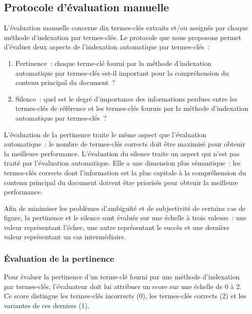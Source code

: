     \subsection{Protocole d'évaluation manuelle}
    \label{subsec:main-automatic_evaluation_of_keyphrase_annotation-methodology-evaluation_protocol}
      L'évaluation manuelle concerne dix termes-clés extraits et/ou assignés par
      chaque méthode d'indexation par termes-clés. Le protocole que nous
      proposons permet d'évaluer deux aspects de l'indexation automatique par
      termes-clés~:
      \begin{enumerate}
        \item{Pertinence~: chaque terme-clé fourni par la méthode d'indexation
              automatique par termes-clés est-il important pour la compréhension
              du contenu principal du document~?}
        \item{Silence~: quel est le degré d'importance des informations perdues
              entre les termes-clés de référence et les termes-clés fournis par
              la méthode d'indexation automatique par termes-clés~?}
      \end{enumerate}
      L'évaluation de la pertinence traite le même aspect que l'évaluation
      automatique~: le nombre de termes-clés corrects doit être maximisé pour
      obtenir la meilleure performance. L'évaluation du silence traite un aspect
      qui n'est pas traité par l'évaluation automatique. Elle a une dimension
      plus sémantique~: les termes-clés corrects dont l'information est la plus
      capitale à la compréhension du contenu principal du document doivent être
      priorisés pour obtenir la meilleure performance.

      Afin de minimiser les problèmes d'ambiguïté et de subjectivité de certains
      cas de figure, la pertinence et le silence sont évalués sur une échelle à
      trois valeurs~: une valeur représentant l'échec, une autre représentant le
      succès et une dernière valeur représentant un cas intermédiaire.

      \subsubsection{Évaluation de la pertinence}
      \label{subsubsec:main-automatic_evaluation_of_keyphrase_annotation-methodology-evaluation_protocol-relevancy}
        Pour évaluer la pertinence d'un terme-clé fourni par une méthode
        d'indexation par termes-clés, l'évaluateur doit lui attribuer un score
        sur une échelle de 0 à 2. Ce score distingue les termes-clés incorrects
        (0), les termes-clés corrects (2) et les variantes de ces derniers (1).

